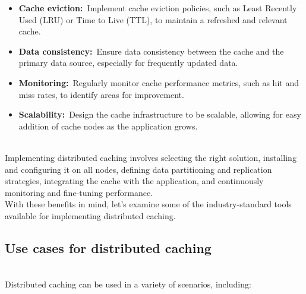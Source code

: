 \begin{itemize}
\item
\protect{}\label{KQnhErRatsEt0RtIBG6Ds}
\textbf{Cache eviction:}~Implement cache eviction policies, such as Least Recently Used (LRU) or Time to Live (TTL), to maintain a refreshed and relevant cache.
\item
\protect{}\label{DLwKAFvZEjyzkkxdabUIJ}
\textbf{Data consistency:}~Ensure data consistency between the cache and the primary data source, especially for frequently updated data.
\item
\protect{}\label{ytPT3KWcaFDvvgwDNtyDe}
\textbf{Monitoring:}~Regularly monitor cache performance metrics, such as hit and miss rates, to identify areas for improvement.
\item
\protect{}\label{N1ZIcgS8xIk7KTYwmPc1V}
\textbf{Scalability:}~Design the cache infrastructure to be scalable, allowing for easy addition of cache nodes as the application grows.
\end{itemize}
\\
Implementing distributed caching involves selecting the right solution, installing and configuring it on all nodes, defining data partitioning and replication strategies, integrating the cache with the application, and continuously monitoring and fine-tuning performance.
\\
With these benefits in mind, let's examine some of the industry-standard tools available for implementing distributed caching.

\subsection{Use cases for distributed caching}\label{Dzr0wLsUA586-iDnQR799}
\\
Distributed caching can be used in a variety of scenarios, including:


